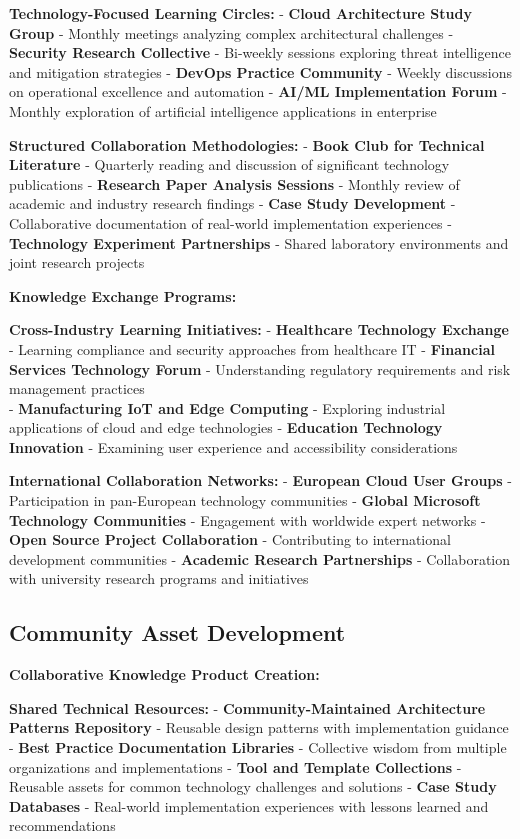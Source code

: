 \documentclass[
  letterpaper,
  DIV=11,
  numbers=noendperiod]{scrartcl}
\begin{document}
\textbf{Technology-Focused Learning Circles:} - \textbf{Cloud
Architecture Study Group} - Monthly meetings analyzing complex
architectural challenges - \textbf{Security Research Collective} -
Bi-weekly sessions exploring threat intelligence and mitigation
strategies - \textbf{DevOps Practice Community} - Weekly discussions on
operational excellence and automation - \textbf{AI/ML Implementation
Forum} - Monthly exploration of artificial intelligence applications in
enterprise

\textbf{Structured Collaboration Methodologies:} - \textbf{Book Club for
Technical Literature} - Quarterly reading and discussion of significant
technology publications - \textbf{Research Paper Analysis Sessions} -
Monthly review of academic and industry research findings - \textbf{Case
Study Development} - Collaborative documentation of real-world
implementation experiences - \textbf{Technology Experiment Partnerships}
- Shared laboratory environments and joint research projects

\textbf{Knowledge Exchange Programs:}

\textbf{Cross-Industry Learning Initiatives:} - \textbf{Healthcare
Technology Exchange} - Learning compliance and security approaches from
healthcare IT - \textbf{Financial Services Technology Forum} -
Understanding regulatory requirements and risk management practices\\
- \textbf{Manufacturing IoT and Edge Computing} - Exploring industrial
applications of cloud and edge technologies - \textbf{Education
Technology Innovation} - Examining user experience and accessibility
considerations

\textbf{International Collaboration Networks:} - \textbf{European Cloud
User Groups} - Participation in pan-European technology communities -
\textbf{Global Microsoft Technology Communities} - Engagement with
worldwide expert networks - \textbf{Open Source Project Collaboration} -
Contributing to international development communities - \textbf{Academic
Research Partnerships} - Collaboration with university research programs
and initiatives

\subsection{Community Asset
Development}\label{community-asset-development}

\textbf{Collaborative Knowledge Product Creation:}

\textbf{Shared Technical Resources:} - \textbf{Community-Maintained
Architecture Patterns Repository} - Reusable design patterns with
implementation guidance - \textbf{Best Practice Documentation Libraries}
- Collective wisdom from multiple organizations and implementations -
\textbf{Tool and Template Collections} - Reusable assets for common
technology challenges and solutions - \textbf{Case Study Databases} -
Real-world implementation experiences with lessons learned and
recommendations
\end{document}
